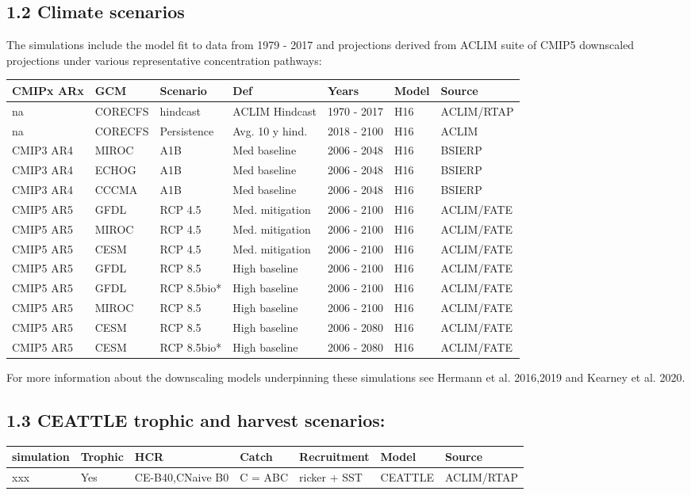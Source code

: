 \documentclass[]{article}
\begin{document}
\subsection{1.2 Climate scenarios}\label{climate-scenarios}

The simulations include the model fit to data from 1979 - 2017 and
projections derived from ACLIM suite of CMIP5 downscaled projections
under various representative concentration pathways:

\begin{longtable}[]{@{}lllllll@{}}
\toprule
CMIPx ARx & GCM & Scenario & Def & Years & Model & Source\tabularnewline
\midrule
\endhead
na & CORECFS & hindcast & ACLIM Hindcast & 1970 - 2017 & H16 &
ACLIM/RTAP\tabularnewline
na & CORECFS & Persistence & Avg. 10 y hind. & 2018 - 2100 & H16 &
ACLIM\tabularnewline
CMIP3 AR4 & MIROC & A1B & Med baseline & 2006 - 2048 & H16 &
BSIERP\tabularnewline
CMIP3 AR4 & ECHOG & A1B & Med baseline & 2006 - 2048 & H16 &
BSIERP\tabularnewline
CMIP3 AR4 & CCCMA & A1B & Med baseline & 2006 - 2048 & H16 &
BSIERP\tabularnewline
CMIP5 AR5 & GFDL & RCP 4.5 & Med. mitigation & 2006 - 2100 & H16 &
ACLIM/FATE\tabularnewline
CMIP5 AR5 & MIROC & RCP 4.5 & Med. mitigation & 2006 - 2100 & H16 &
ACLIM/FATE\tabularnewline
CMIP5 AR5 & CESM & RCP 4.5 & Med. mitigation & 2006 - 2100 & H16 &
ACLIM/FATE\tabularnewline
CMIP5 AR5 & GFDL & RCP 8.5 & High baseline & 2006 - 2100 & H16 &
ACLIM/FATE\tabularnewline
CMIP5 AR5 & GFDL & RCP 8.5bio* & High baseline & 2006 - 2100 & H16 &
ACLIM/FATE\tabularnewline
CMIP5 AR5 & MIROC & RCP 8.5 & High baseline & 2006 - 2100 & H16 &
ACLIM/FATE\tabularnewline
CMIP5 AR5 & CESM & RCP 8.5 & High baseline & 2006 - 2080 & H16 &
ACLIM/FATE\tabularnewline
CMIP5 AR5 & CESM & RCP 8.5bio* & High baseline & 2006 - 2080 & H16 &
ACLIM/FATE\tabularnewline
\bottomrule
\end{longtable}

For more information about the downscaling models underpinning these
simulations see Hermann et al. 2016,2019 and Kearney et al. 2020.

\subsection{1.3 CEATTLE trophic and harvest
scenarios:}\label{ceattle-trophic-and-harvest-scenarios}

\begin{longtable}[]{@{}lllllll@{}}
\toprule
simulation & Trophic & HCR & Catch & Recruitment & Model &
Source\tabularnewline
\midrule
\endhead
xxx & Yes & CE-B40,CNaive B0 & C = ABC & ricker + SST & CEATTLE &
ACLIM/RTAP\tabularnewline
\bottomrule
\end{longtable}
\end{document}
